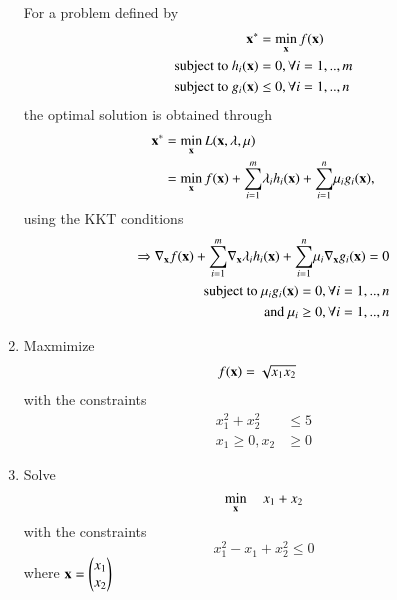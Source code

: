 \documentclass[journal,12pt,twocolumn]{IEEEtran}
\renewcommand\thesection{\arabic{section}}
\begin{document}
\begin{enumerate}[label=\thesection.\arabic*,ref=\thesection.\theenumi]
\solution For a problem defined by 
\begin{align}
\mathbf{x^*} &= \min_{\mathbf{x}}f(\mathbf{x})
\\
\text{subject to } h_i(\mathbf{x}) &= 0, \forall i=1,..,m
\\
\text{subject to } g_i(\mathbf{x}) &\le 0, \forall i=1,..,n
\end{align}
%
the optimal solution is obtained through
%
\begin{align}
\mathbf{x^*} &= \min_{\mathbf{x}}L(\mathbf{x}, \mathbf{\lambda}, \mathbf{\mu}) 
\\
&= \min_{\mathbf{x}}f(\mathbf{x})  + \underset{i=1}{\overset{m}{\sum}} \lambda_i h_i(\mathbf{x}) + \underset{i=1}{\overset{n}{\sum}} \mu_i g_i(\mathbf{x}),
\end{align}
%
using the KKT conditions
%
\begin{align}
\Rightarrow \nabla_\mathbf{x} f(\mathbf{x})  + \underset{i=1}{\overset{m}{\sum}} \nabla_\mathbf{x} \lambda_i h_i(\mathbf{x}) + \underset{i=1}{\overset{n}{\sum}} \mu_i \nabla_\mathbf{x} g_i(\mathbf{x}) = 0 
\\
\text{subject to }\mu_i g_i(\mathbf{x}) = 0, \forall i = 1,..,n
\\
\text{and }\mu_i \ge 0, \forall i = 1,..,n
\end{align}
%
\item
	Maxmimize 
	\begin{align}
	f(\mathbf{x}) &= \sqrt{x_1x_2}
	\end{align}
	with the constraints
	\begin{align}
	x_1^2+x_2^2 &\leq 5 \\
	x_1 \geq 0, x_2 &\geq 0
	\end{align}

%
\item
	\label{convex_sdp_eqiv}
	Solve
	\begin{equation}
	\min_{\mathbf{x}} \quad x_1 + x_2
	\end{equation}
	with the constraints
	\begin{equation}
	x_1^2 - x_1 + x_2^2 \leq 0
	\end{equation}
where 
$
\mathbf{x} = \begin{pmatrix}
x_1 \\
x_2
\end{pmatrix}
$


\end{enumerate}
\end{document}
